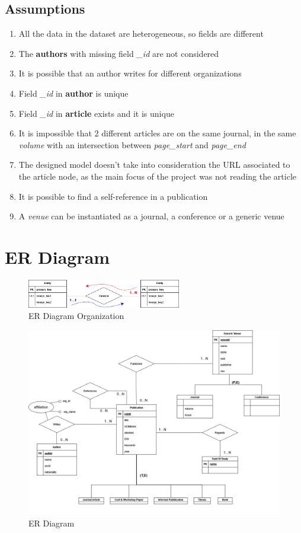 \documentclass{Configuration_Files/PoliMi3i_thesis}
\begin{document}
\section{Assumptions}
\label{sec:assumptions}
\begin{enumerate}
    \item All the data in the dataset are heterogeneous, so fields are different
    \item The \textbf{authors} with missing field \emph{\_id} are not considered
    \item It is possible that an author writes for different organizations
    \item Field \emph{\_id} in \textbf{author} is unique
    \item Field \emph{\_id} in \textbf{article} exists and it is unique
    \item It is impossible that 2 different articles are on the same journal, in the same \emph{volume} with an intersection between \emph{page\_start} and \emph{page\_end}
    \item The designed model doesn't take into consideration the URL associated to the article node, as the main focus of the project was not reading the article
    \item It is possible to find a self-reference in a publication
    \item A \emph{venue} can be instantiated as a journal, a conference or a generic venue
\end{enumerate}

\chapter{ER Diagram}
\begin{figure}[H]
    \centering
    \includegraphics[width=0.6\textwidth]{legendaER.png}
    \caption{ER Diagram Organization}
    \label{fig:erleg}
\end{figure}
\bigskip
\begin{figure}[H]
    \centering
    \includegraphics[width=1\textwidth]{ER.png}
    \caption{ER Diagram}
    \label{fig:er}
\end{figure}
\end{document}
